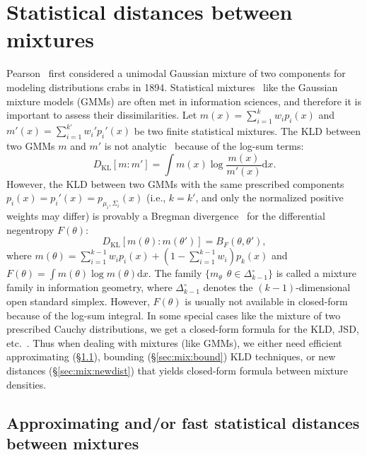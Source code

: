 \documentclass[11pt]{article}
\def\KL{\mathrm{KL}}
\def\dx{\mathrm{d}x}
\def\KL{\mathrm{KL}}
\begin{document}
\section{Statistical distances between mixtures}

Pearson~\cite{pearson1894contributions} first considered a unimodal Gaussian mixture of two components for modeling distributions crabs in 1894.
Statistical mixtures~\cite{mclachlan1988mixture} like the Gaussian mixture models (GMMs) are often met in information sciences, and therefore it is important to assess their dissimilarities.
Let $m(x)=\sum_{i=1}^k w_i p_i(x)$ and  $m'(x)=\sum_{i=1}^{k'} w_i' p_i'(x)$ be two finite statistical mixtures.
The KLD between two GMMs $m$ and $m'$ is not analytic~\cite{KLnotanalytic-2004} because of the log-sum terms:
$$
D_\KL[m:m']=\int m(x)\log\frac{m(x)}{m'(x)} \dx.
$$
However, the KLD between two GMMs with the same prescribed components $p_i(x)=p_i'(x)=p_{\mu_i,\Sigma_i}(x)$ (i.e., $k=k'$, and only the normalized positive weights may differ) is provably a Bregman divergence~\cite{wmixtures-2018} for the differential negentropy $F(\theta)$: 
$$
D_\KL[m(\theta):m(\theta')]=B_F(\theta,\theta'),
$$
where $m(\theta)=\sum_{i=1}^{k-1} w_ip_i(x)+(1-\sum_{i=1}^{k-1} w_i)p_k(x)$ and
$F(\theta)=\int m(\theta)\log m(\theta)\dx$. The family $\{m_\theta\: \ \theta\in\Delta_{k-1}^\circ\}$ is called a mixture family in information geometry, where $\Delta_{k-1}^\circ$ denotes the $(k-1)$-dimensional open standard simplex.
However, $F(\theta)$ is usually not available in closed-form because of the log-sum integral.
In some special cases like the mixture of two prescribed Cauchy distributions, we get a closed-form formula for the KLD, JSD, etc.~\cite{nielsen2021f,nielsen2021dually}.
Thus when dealing with mixtures (like GMMs), we either need efficient approximating  (\S\ref{sec:mix:approx}), bounding (\S\ref{sec:mix:bound}) KLD techniques, or new distances (\S\ref{sec:mix:newdist}) that yields closed-form formula between mixture densities.



\subsection{Approximating and/or fast statistical distances between mixtures}\label{sec:mix:approx}
\end{document}
